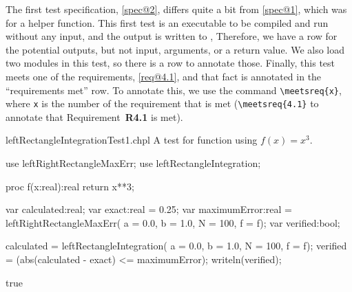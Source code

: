   \begin{seamlessnote}
    The first test specification, \ref{spec@2}, differs quite a bit from \ref{spec@1}, which was
    for a helper function. This first test is an executable to be compiled and run without any 
    input, and the output is written to , Therefore, we have a row for the 
    potential outputs, but not input, arguments, or a return value. We also load two modules
    in this test, so there is a row to annotate those.  Finally, this test meets one of the
    requirements, \ref{req@4.1}, and that fact is annotated in the ``requirements met'' row.
    To annotate this, we use the command \verb|\meetsreq{x}|, where \verb|x| is the number of the
    requirement that is met (\eg \verb|\meetsreq{4.1}| to annotate that Requirement~\textbf{R4.1}
    is met).
  \end{seamlessnote}

  \begin{chapeltest}{leftRectangleIntegrationTest1.chpl}
    A test for function  using $f(x) = x^3$.
    \begin{chapelpre}
    \end{chapelpre}
    \begin{chapel}
use leftRightRectangleMaxErr;
use leftRectangleIntegration;

proc f(x:real):real {
  return x**3;
} 

var calculated:real;
var exact:real = 0.25;
var maximumError:real = leftRightRectangleMaxErr(
  a = 0.0, b = 1.0, N = 100, f = f);
var verified:bool;

calculated = leftRectangleIntegration(
  a = 0.0, b = 1.0, N = 100, f = f);
verified = (abs(calculated - exact) <= maximumError);
writeln(verified);
    \end{chapel}
    \begin{chapelpost}
    \end{chapelpost}
    \begin{chapeloutput}
true
    \end{chapeloutput}
  \end{chapeltest}

